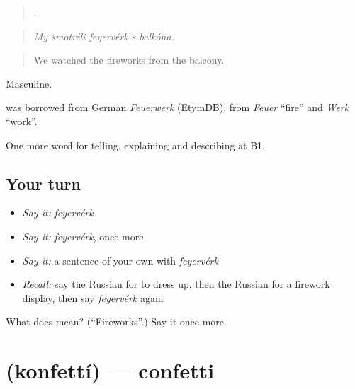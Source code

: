 \begin{quote}
    .
\end{quote}

\begin{quote}
\emph{My smotréli feyervérk s balkóna.}
\end{quote}

\begin{quote}
We watched the fireworks from the balcony.
\end{quote}

Masculine.

\begin{cousinweb}
\emph{} was borrowed from German \emph{Feuerwerk} (EtymDB), from \emph{Feuer} \textquotedblleft{}fire\textquotedblright{} and \emph{Werk} \textquotedblleft{}work\textquotedblright{}.
\end{cousinweb}

\begin{grammarlens}[title={What you've built}]
One more word for telling, explaining and describing at B1.
\end{grammarlens}

\subsection*{Your turn}
\begin{itemize}
\raggedright
  \item \emph{Say it:} \emph{feyervérk}
  \item \emph{Say it:} \emph{feyervérk}, once more
  \item \emph{Say it:} a sentence of your own with \emph{feyervérk}
  \item \emph{Recall:} say the Russian for to dress up, then the Russian for a firework display, then say \emph{feyervérk} again
\end{itemize}

\begin{tcolorbox}[breakable,colback=teal!4,colframe=teal!35!black,title={Before you move on}]
What does  mean? (\textquotedblleft{}Fireworks\textquotedblright{}.) Say it once more.
\end{tcolorbox}
\section[\texorpdfstring{\ru{конфетти} (konfettí)}{конфетти (konfettí)}]{ (konfettí) — confetti}

